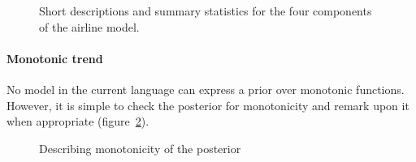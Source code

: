 \documentclass{article}
\begin{document}
\begin{figure}[h]
\centering
{}
\caption{
Short descriptions and summary statistics for the four components of the airline model.}
\label{fig:exec-airline}
\end{figure}

\paragraph{Monotonic trend}

No model in the current language can express a prior over monotonic functions.
However, it is simple to check the posterior for monotonicity and remark upon it when appropriate (figure~\ref{fig:monotonic}).

\begin{figure}[h]
\centering
{}
\caption{Describing monotonicity of the posterior}
\label{fig:monotonic}
\end{figure}
\end{document}
